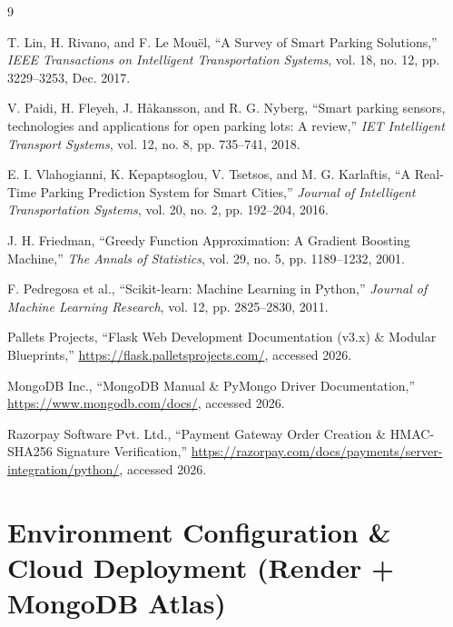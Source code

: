 \documentclass[12pt,a4paper,oneside]{report}
\begin{document}
\begin{thebibliography}{9}

T. Lin, H. Rivano, and F. Le Mou\"el, ``A Survey of Smart Parking Solutions,'' \textit{IEEE Transactions on Intelligent Transportation Systems}, vol. 18, no. 12, pp. 3229--3253, Dec. 2017.

V. Paidi, H. Fleyeh, J. H\aa kansson, and R. G. Nyberg, ``Smart parking sensors, technologies and applications for open parking lots: A review,'' \textit{IET Intelligent Transport Systems}, vol. 12, no. 8, pp. 735--741, 2018.

E. I. Vlahogianni, K. Kepaptsoglou, V. Tsetsos, and M. G. Karlaftis, ``A Real-Time Parking Prediction System for Smart Cities,'' \textit{Journal of Intelligent Transportation Systems}, vol. 20, no. 2, pp. 192--204, 2016.

J. H. Friedman, ``Greedy Function Approximation: A Gradient Boosting Machine,'' \textit{The Annals of Statistics}, vol. 29, no. 5, pp. 1189--1232, 2001.

F. Pedregosa et al., ``Scikit-learn: Machine Learning in Python,'' \textit{Journal of Machine Learning Research}, vol. 12, pp. 2825--2830, 2011.

Pallets Projects, ``Flask Web Development Documentation (v3.x) \& Modular Blueprints,'' \url{https://flask.palletsprojects.com/}, accessed 2026.

MongoDB Inc., ``MongoDB Manual \& PyMongo Driver Documentation,'' \url{https://www.mongodb.com/docs/}, accessed 2026.

Razorpay Software Pvt. Ltd., ``Payment Gateway Order Creation \& HMAC-SHA256 Signature Verification,'' \url{https://razorpay.com/docs/payments/server-integration/python/}, accessed 2026.

\end{thebibliography}

\appendix
\chapter{Environment Configuration \& Cloud Deployment (Render + MongoDB Atlas)}
\end{document}
